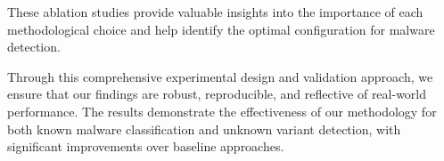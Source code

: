 These ablation studies provide valuable insights into the importance of each methodological choice and help identify the optimal configuration for malware detection.

Through this comprehensive experimental design and validation approach, we ensure that our findings are robust, reproducible, and reflective of real-world performance. The results demonstrate the effectiveness of our methodology for both known malware classification and unknown variant detection, with significant improvements over baseline approaches.
